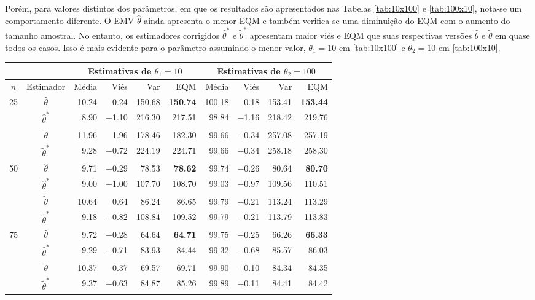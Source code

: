 \documentclass[12pt]{article}
\theoremstyle{definition}
\begin{document}
Porém, para valores distintos dos parâmetros, em que os resultados são apresentados nas Tabelas \ref{tab:10x100} e \ref{tab:100x10}, nota-se um comportamento diferente. O EMV $\hat{\theta}$ ainda apresenta o menor EQM e também verifica-se uma diminuição do EQM com o aumento do tamanho amostral. No entanto, os estimadores corrigidos $\hat{\theta}^*$ e $\tilde{\theta}^*$ apresentam maior viés e EQM que suas respectivas versões $\hat{\theta}$ e $\tilde{\theta}$ em quase todos os casos. Isso é mais evidente para o parâmetro assumindo o menor valor, $\theta_1 = 10$ em \ref{tab:10x100} e $\theta_2 = 10$ em \ref{tab:100x10}.


\begin{table}[htbp]
\centering
\begin{tabular}{c|c|rrrr|rrrr}
 \multicolumn{2}{c}{} & \multicolumn{4}{|c|}{Estimativas de $\theta_1=10$} &  \multicolumn{4}{c}{Estimativas de $\theta_2=100$} \\
  \hline
 $n$ & Estimador & Média & Viés & Var & EQM & Média & Viés & Var & EQM \\ 
  \hline
   25 & $\hat{\theta}$ & 10.24 & 0.24 & 150.68 & \textbf{150.74} & 100.18 & 0.18 & 153.41 & \textbf{153.44} \\ 
    & $\hat{\theta}^*$ & 8.90 & $-$1.10 & 216.30 & 217.51 & 98.84 & $-$1.16 & 218.42 & 219.76 \\ 
    & $\tilde{\theta}$ & 11.96 & 1.96 & 178.46 & 182.30 & 99.66 & $-$0.34 & 257.08 & 257.19 \\ 
    & $\tilde{\theta}^*$ & 9.28 & $-$0.72 & 224.19 & 224.71 & 99.66 & $-$0.34 & 258.18 & 258.30 \\ 
  
   \hline
    50 & $\hat{\theta}$ & 9.71 & $-$0.29 & 78.53 & \textbf{78.62} & 99.74 & $-$0.26 & 80.64 & \textbf{80.70} \\ 
        & $\hat{\theta}^*$ & 9.00 & $-$1.00 & 107.70 & 108.70 & 99.03 & $-$0.97 & 109.56 & 110.51 \\ 
        & $\tilde{\theta}$ & 10.64 & 0.64 & 86.24 & 86.65 & 99.79 & $-$0.21 & 113.24 & 113.29 \\ 
        & $\tilde{\theta}^*$ & 9.18 & $-$0.82 & 108.84 & 109.52 & 99.79 & $-$0.21 & 113.79 & 113.83 \\  

    \hline
    75 & $\hat{\theta}$ & 9.72 & $-$0.28 & 64.64 & \textbf{64.71} & 99.75 & $-$0.25 & 66.26 & \textbf{66.33} \\ 
        & $\hat{\theta}^*$ & 9.29 & $-$0.71 & 83.93 & 84.44 & 99.32 & $-$0.68 & 85.57 & 86.03 \\ 
        & $\tilde{\theta}$ & 10.37 & 0.37 & 69.57 & 69.71 & 99.90 & $-$0.10 & 84.34 & 84.35 \\ 
        & $\tilde{\theta}^*$ & 9.37 & $-$0.63 & 84.87 & 85.26 & 99.89 & $-$0.11 & 84.41 & 84.42 \\


\end{tabular}
\end{table}
\end{document}
